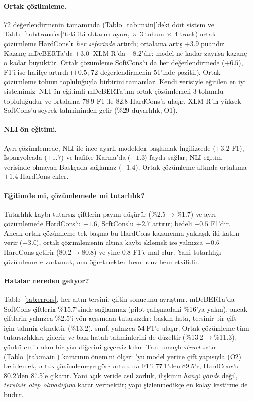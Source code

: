 \paragraph{Ortak çözümleme.} 72 değerlendirmenin tamamında (Tablo~\ref{tab:main}'deki dört sistem ve Tablo~\ref{tab:transfer}'teki iki aktarım ayarı, $\times$ 3 tohum $\times$ 4 track) ortak çözümleme HardCons'u \emph{her seferinde} artırdı; ortalama artış $+3.9$ puandır. Kazanç mDeBERTa'da $+3.0$, XLM-R'da $+8.2$'dir: model ne kadar zayıfsa kazanç o kadar büyüktür. Ortak çözümleme SoftCons'u da her değerlendirmede ($+6.5$), F1'i ise hafifçe artırdı ($+0.5$; 72 değerlendirmenin 51'inde pozitif). Ortak çözümleme tohum topluluğuyla birbirini tamamlar. Kendi verisiyle eğitilen en iyi sistemimiz, NLI ön eğitimli mDeBERTa'nın ortak çözümlemeli 3 tohumlu topluluğudur ve ortalama 78.9 F1 ile 82.8 HardCons'a ulaşır. XLM-R'ın yüksek SoftCons'u seyrek \NO tahmininden gelir (\%29 duyarlılık; O1).

\paragraph{NLI ön eğitimi.} Ayrı çözümlemede, NLI ile ince ayarlı modelden başlamak İngilizcede ($+3.2$ F1), İspanyolcada ($+1.7$) ve hafifçe Karma'da ($+1.3$) fayda sağlar; NLI eğitim verisinde olmayan Baskçada sağlamaz ($-1.4$). Ortak çözümleme altında ortalama $+1.4$ HardCons ekler.

\paragraph{Eğitimde mi, çözümlemede mi tutarlılık?} Tutarlılık kaybı tutarsız çiftlerin payını düşürür (\%2.5$\rightarrow$\%1.7) ve ayrı çözümlemede HardCons'u $+1.6$, SoftCons'u $+2.7$ artırır; bedeli $-0.5$ F1'dir. Ancak ortak çözümleme tek başına bu HardCons kazancının yaklaşık iki katını verir ($+3.0$), ortak çözümlemenin altına kaybı eklemek ise yalnızca $+0.6$ HardCons getirir (80.2$\rightarrow$80.8) ve yine 0.8 F1'e mal olur. Yani tutarlılığı çözümlemede zorlamak, onu öğretmekten hem ucuz hem etkilidir.



\paragraph{Hatalar nereden geliyor?} Tablo~\ref{tab:errors}, her altın tersinir çiftin sonucunu ayrıştırır. mDeBERTa'da SoftCons çiftlerin \%15.7'sinde sağlanmaz (pilot çalışmadaki \%16'ya yakın), ancak çiftlerin yalnızca \%2.5'i yön açısından tutarsızdır: baskın hata, tersinir bir çift için \NO tahmin etmektir (\%13.2). \NO sınıfı yalnızca 54 F1'e ulaşır. Ortak çözümleme tüm tutarsızlıkları giderir ve bazı hatalı \NO tahminlerini de düzeltir (\%13.2$\rightarrow$\%11.3), çünkü emin olan bir yön diğerini geçersiz kılar. Tanı amaçlı \emph{struct} satırı (Tablo~\ref{tab:main}) \NO kararının önemini ölçer: \NO'yu model yerine çift yapısıyla (O2) belirlemek, ortak çözümlemeye göre ortalama F1'i 77.1'den 89.5'e, HardCons'u 80.2'den 87.5'e çıkarır. Yani açık veride asıl zorluk, ilişkinin \emph{hangi yönde} değil, \emph{tersinir olup olmadığına} karar vermektir; yapı gizlenmedikçe en kolay kestirme de budur.

